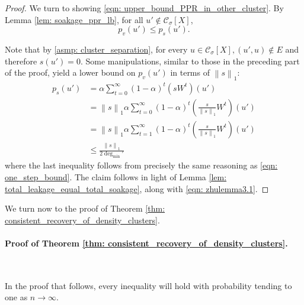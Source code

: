 \documentclass{article}
\newcommand{\norm}[1]{\left\lVert#1\right\rVert}
\newcommand{\1}{\mathbf{1}}
\newcommand{\pbf}{p}        %
\newcommand{\Xbf}{X}             %
\newcommand{\Wbf}{W}
\newcommand{\Cset}{\mathcal{C}}
\newcommand{\Csig}{\Cset_{\sigma}}
\newcommand{\degminpr}{\deg_{\min}'}
\theoremstyle{aldenthm}
\theoremstyle{aldenrmrk}
\begin{document}
\begin{proof}
	We turn to showing \eqref{eqn: upper_bound_PPR_in_other_cluster}. By Lemma \ref{lem: soakage_ppr_lb}, for all $u' \not\in \Csig[\Xbf]$,
	\begin{equation*}
	\pbf_v(u') \leq \pbf_s(u').
	\end{equation*}
	
	Note that by \ref{asmp: cluster_separation}, for every $u \in \Csig[\Xbf], (u',u) \not\in E$ and therefore $s(u') = 0$. Some manipulations, similar to those in the preceding part of the proof, yield a lower bound on $\pbf_v(u')$ in terms of $\norm{s}_1$:
	\begin{align*}
	\pbf_s(u') & = \alpha \sum_{t = 0}^{\infty} (1 - \alpha)^t \left(s \Wbf^t\right)(u') \\
	& = \norm{s}_1 \alpha \sum_{t = 0}^{\infty} (1 - \alpha)^t \left(\frac{s}{\norm{s}_1} \Wbf^t\right)(u') \\
	& = \norm{s}_1 \alpha \sum_{t = 1}^{\infty} (1 - \alpha)^t \left(\frac{s}{\norm{s}_1} \Wbf^t\right)(u') \\
	& \leq \frac{\norm{s}_1}{2\degminpr}
	\end{align*}
	where the last inequality follows from precisely the same reasoning as \eqref{eqn: one_step_bound}. The claim follows in light of Lemma \ref{lem: total_leakage_equal_total_soakage}, along with \eqref{eqn: zhulemma3.1}.
\end{proof}


We turn now to the proof of Theorem \ref{thm: consistent_recovery_of_density_clusters}.

\paragraph{Proof of Theorem \ref{thm: consistent_recovery_of_density_clusters}.}
~

In the proof that follows, every inequality will hold with probability tending to one as $n \to \infty$.
\end{document}
